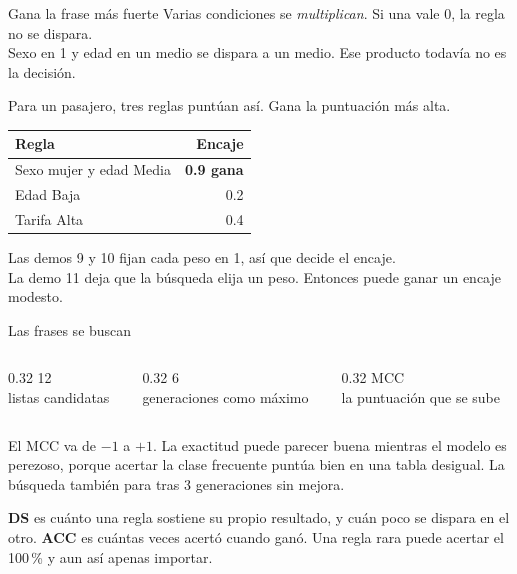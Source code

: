 \documentclass[aspectratio=169,11pt]{beamer}
\begin{document}
\begin{frame}{Gana la frase más fuerte}
  Varias condiciones se \emph{multiplican}. Si una vale 0, la regla no se dispara.\\
  Sexo en 1 y edad en un medio se dispara a un medio. Ese producto todavía no es la decisión.
  \vspace{0.35em}

  {\small Para un pasajero, tres reglas puntúan así. Gana la puntuación más alta.}
  \vspace{0.4em}

  \renewcommand{\arraystretch}{1.22}
  \begin{tabular}{@{}p{} r@{}}
    \toprule
    Regla & Encaje \\
    \midrule
    Sexo mujer y edad Media & \textcolor{ebdgreen}{\textbf{0.9 gana}} \\
    Edad Baja & 0.2 \\
    Tarifa Alta & 0.4 \\
    \bottomrule
  \end{tabular}

  \vspace{0.4em}
  {\small Las demos 9 y 10 fijan cada peso en 1, así que decide el encaje.\\
  La demo 11 deja que la búsqueda elija un peso. Entonces puede ganar un encaje modesto.}
\end{frame}

\begin{frame}{Las frases se buscan}
  \begin{columns}[c]
    \begin{column}{0.32\textwidth}
      \centering
      {\color{ebdnavy}\Huge 12}\\[0.2em]
      {\small listas candidatas}
    \end{column}
    \begin{column}{0.32\textwidth}
      \centering
      {\color{ebdnavy}\Huge 6}\\[0.2em]
      {\small generaciones como máximo}
    \end{column}
    \begin{column}{0.32\textwidth}
      \centering
      {\color{ebdnavy}\Huge MCC}\\[0.2em]
      {\small la puntuación que se sube}
    \end{column}
  \end{columns}
  \vspace{0.55em}
  {\small El MCC va de \(-1\) a \(+1\). La exactitud puede parecer buena mientras el modelo es perezoso, porque acertar la clase frecuente puntúa bien en una tabla desigual. La búsqueda también para tras 3 generaciones sin mejora.}
  \vspace{0.35em}

  {\small \textbf{DS} es cuánto una regla sostiene su propio resultado, y cuán poco se dispara en el otro. \textbf{ACC} es cuántas veces acertó cuando ganó. Una regla rara puede acertar el 100\,\% y aun así apenas importar.}
\end{frame}
\end{document}
